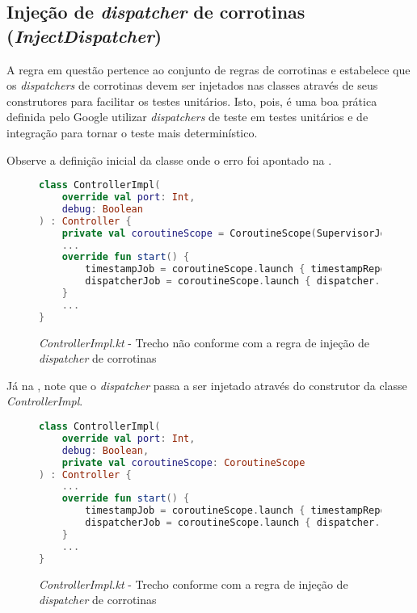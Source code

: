 \subsection{Injeção de \textit{dispatcher} de corrotinas (\textit{InjectDispatcher})}

A regra em questão pertence ao conjunto de regras de corrotinas e estabelece que os \textit{dispatchers} de corrotinas devem ser injetados nas classes através de seus construtores para facilitar os testes unitários. Isto, pois, é uma boa prática definida pelo Google utilizar \textit{dispatchers} de teste em testes unitários e de integração para tornar o teste mais determinístico\cite{android_corroutines_test_best_practices}.

Observe a definição inicial da classe onde o erro foi apontado na .

\begin{figure}[H]
    \centering
    \begin{lstlisting}[language=Kotlin]
class ControllerImpl(
    override val port: Int,
    debug: Boolean
) : Controller {
    private val coroutineScope = CoroutineScope(SupervisorJob() + Dispatchers.IO)
    ...
    override fun start() {
        timestampJob = coroutineScope.launch { timestampRepository.run() }
        dispatcherJob = coroutineScope.launch { dispatcher.run() }
    }
    ...
}
    \end{lstlisting}
    \caption{\textit{ControllerImpl.kt} - Trecho não conforme com a regra de injeção de \textit{dispatcher} de corrotinas}
    \label{fig:detekt_inject_dispatcher_before_example}
\end{figure}

Já na , note que o \textit{dispatcher} passa a ser injetado através do construtor da classe \textit{ControllerImpl}.

\begin{figure}[H]
    \centering
    \begin{lstlisting}[language=Kotlin]
class ControllerImpl(
    override val port: Int,
    debug: Boolean,
    private val coroutineScope: CoroutineScope
) : Controller {
    ...
    override fun start() {
        timestampJob = coroutineScope.launch { timestampRepository.run() }
        dispatcherJob = coroutineScope.launch { dispatcher.run() }
    }
    ...
}
    \end{lstlisting}
    \caption{\textit{ControllerImpl.kt} - Trecho conforme com a regra de injeção de \textit{dispatcher} de corrotinas}
    \label{fig:detekt_inject_dispatcher_after_example}
\end{figure}


